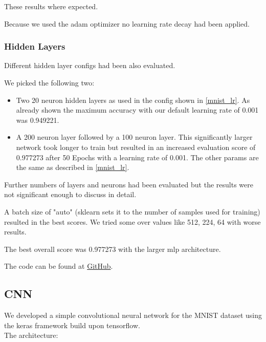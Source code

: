 \documentclass[a4paper, 11pt]{article}
\begin{document}
These results where expected.

Because we used the adam optimizer no learning rate decay had been applied.

\subsubsection{Hidden Layers}

Different hidden layer configs had been also evaluated.

We picked the following two:

\begin{itemize}
    \item Two 20 neuron hidden layers as used in the config shown in \ref{mnist_lr}.
    As already shown the maximum accuracy with our default learning rate of 0.001 was 0.949221.
    \item A 200 neuron layer followed by a 100 neuron layer.
    This significantly larger network took longer to train but resulted in an increased evaluation score of 0.977273 after 50 Epochs with a learning rate of 0.001.
    The other params are the same as described in \ref{mnist_lr}.
\end{itemize}

Further numbers of layers and neurons had been evaluated but the results were not significant enough to discuss in detail.

A batch size of "auto" (sklearn sets it to the number of samples used for training) resulted in the best scores.
We tried some over values like 512, 224, 64 with worse results.

The best overall score was 0.977273 with the larger mlp architecture.

The code can be found at \href{https://github.com/Flova/DAIS/blob/master//%C3%9Cbung 4/MNIST.ipynb}{GitHub}.

\subsection{CNN}

We developed a simple convolutional neural network for the MNIST dataset using the keras framework build upon tensorflow.\\

The architecture:
\end{document}

